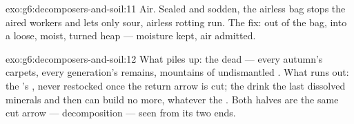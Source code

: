 \begin{solution}{exo:g6:decomposers-and-soil:11}
Air. Sealed and sodden, the airless bag stops the aired
workers and lets only sour, airless rotting run. The fix:
out of the bag, into a loose, moist, turned heap ---
moisture kept, air admitted.
\end{solution}

\begin{solution}{exo:g6:decomposers-and-soil:12}
What piles up: the dead --- every autumn's carpets, every
generation's remains, mountains of undismantled . What runs out: the 's , never
restocked once the return arrow is cut; the  drink
the last dissolved minerals and then can build no more,
whatever the . Both halves are the same cut arrow ---
decomposition --- seen from its two ends.
\end{solution}

